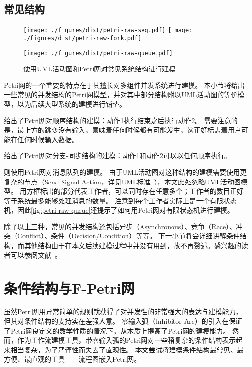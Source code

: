 \documentclass[index]{subfiles}
\begin{document}
\subsection{常见结构}
\begin{figure}[h]
  \centering%
    {\texttt{[image: ./figures/dist/petri-raw-seq.pdf]}}
  \hspace{1em}
    {\texttt{[image: ./figures/dist/petri-raw-fork.pdf]}}\par
    {\texttt{[image: ./figures/dist/petri-raw-queue.pdf]}}
  \caption{使用UML活动图和Petri网对常见系统结构进行建模}
\end{figure}
Petri网的一个重要的特点在于其擅长对多组件并发系统进行建模。
本小节将给出一些常见的并发结构的Petri网模型，并对其中部分结构附以UML活动图的等价模型，以为后续大型系统的建模进行铺垫。

给出了Petri网对顺序结构的建模：动作1执行结束之后执行动作2。
需要注意的是，最上方的跳变没有输入，意味着任何时候都有可能发生，这正好标志着用户可能在任何时候输入数据。

给出了Petri网对分支-同步结构的建模：动作1和动作2可以以任何顺序执行。

则使用Petri网对消息队列的建模。
由于UML活动图对这种结构的建模需要使用更复杂的节点（Send Signal Action，详见UML标准~），本文此处忽略UML活动图模型。
用方框标出的部分代表工作者，可以同时存在任意多个；工作者的数目正好等于系统最多能够处理消息的数量。
注意到每个工作者实际上是一个有限状态机，因此\cref{fig:petri-raw-queue}还提示了如何用Petri网对有限状态机进行建模。

除了以上三种，常见的并发结构还包括异步（Asynchronous）、竞争（Race）、冲突（Conflict）、条件（Decision/Condition）等等。
下一小节将会详细讲解条件结构，而其他结构由于在本文后续建模过程中并没有用到，故不再赘述。感兴趣的读者可以参阅文献~。

\section{条件结构与F-Petri网}
虽然Petri网用异常简单的规则就获得了对并发性的非常强大的表达与建模能力，但其对条件结构的支持实在差强人意\cite{peterson1981}。
零输入弧（Inhibitor Arc）的引入\cite{keller1972}在保证了Petri网良定义的数学性质的情况下，从本质上提高了Petri网的建模能力。
然而，作为工作流建模工具，带零输入弧的Petri网对一些稍复杂的条件结构表示起来相当复杂，为了严谨性而失去了直观性。
本文尝试将建模条件结构最常见、最方便、最直观的工具——流程图\cite{gilbreth1921}嵌入Petri网。
\end{document}
